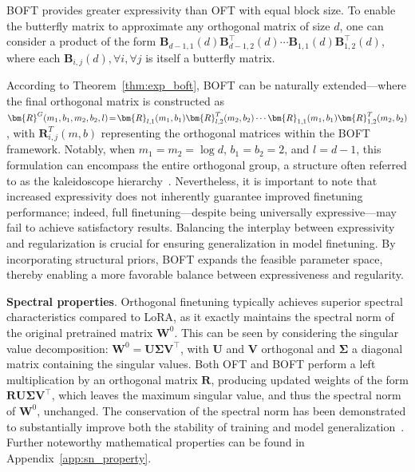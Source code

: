 \begin{theorem}\label{thm:exp_boft}
    BOFT provides greater expressivity than OFT with equal block size. To enable the butterfly matrix to approximate any orthogonal matrix of size $d$, one can consider a product of the form $\bm{B}_{d-1,1}(d)\bm{B}^\top_{d-1,2}(d)\cdots\bm{B}_{1,1}(d)\bm{B}^\top_{1,2}(d)$, where each $\bm{B}_{i,j}(d),\forall i,\forall j$ is itself a butterfly matrix.
\end{theorem}

According to Theorem~\ref{thm:exp_boft}, BOFT can be naturally extended—where the final orthogonal matrix is constructed as $\thickmuskip=2mu \medmuskip=2mu \bm{R}^G(m_1,b_1,m_2,b_2,l)=\bm{R}_{l,1}(m_1,b_1)\bm{R}_{l,2}^T(m_2,b_2)\cdots\bm{R}_{1,1}(m_1,b_1)\bm{R}_{1,2}^T(m_2,b_2)$, with $\bm{R}_{i,j}^T(m,b)$ representing the orthogonal matrices within the BOFT framework. Notably, when $m_1=m_2=\log d$, $b_1=b_2=2$, and $l=d-1$, this formulation can encompass the entire orthogonal group, a structure often referred to as the kaleidoscope hierarchy~\cite{dao2019kaleidoscope}. Nevertheless, it is important to note that increased expressivity does not inherently guarantee improved finetuning performance; indeed, full finetuning—despite being universally expressive—may fail to achieve satisfactory results. Balancing the interplay between expressivity and regularization is crucial for ensuring generalization in model finetuning. By incorporating structural priors, BOFT expands the feasible parameter space, thereby enabling a more favorable balance between expressiveness and regularity.

\textbf{Spectral properties}. Orthogonal finetuning typically achieves superior spectral characteristics compared to LoRA, as it exactly maintains the spectral norm of the original pretrained matrix $\bm{W}^0$. This can be seen by considering the singular value decomposition: $\bm{W}^0=\bm{U}\bm{\Sigma}\bm{V}^\top$, with $\bm{U}$ and $\bm{V}$ orthogonal and $\bm{\Sigma}$ a diagonal matrix containing the singular values. Both OFT and BOFT perform a left multiplication by an orthogonal matrix $\bm{R}$, producing updated weights of the form $\bm{R}\bm{U}\bm{\Sigma}\bm{V}^\top$, which leaves the maximum singular value, and thus the spectral norm of $\bm{W}^0$, unchanged. The conservation of the spectral norm has been demonstrated to substantially improve both the stability of training and model generalization~\cite{miyato2018spectral,yoshida2017spectral}. Further noteworthy mathematical properties can be found in Appendix~\ref{app:sn_property}.

